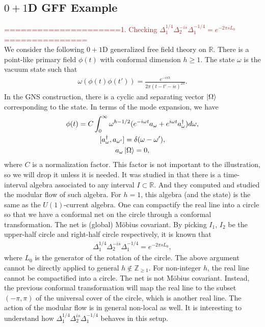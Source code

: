 \documentclass[a4paper,11pt]{article}
\theoremstyle{definition}
\newcommand{\KL}[1]{\textcolor{brown}{#1}}
\begin{document}
\subsection{$0+1$D GFF Example}
\KL{=====================1. Checking $\Delta_1^{1/4}\Delta_2^{-is}\Delta_1^{-1/4} = e^{-2\pi s L_0}$ ===============}\\
We consider the following $0+1$D generalized free field theory on $\mathbb{R}$. There is a point-like primary field $\phi(t)$ with conformal dimension $h \geq 1$. The state $\omega$ is the vacuum state such that
\begin{align}
    \omega(\phi(t)\phi(t')) = \frac{e^{-i\pi h}}{2\pi(t-t'-i\epsilon)^{2h}}.
\end{align}
In the GNS construction, there is a cyclic and separating vector $\ket{\Omega}$ corresponding to the state. In terms of the mode expansion, we have
\begin{gather}
    \phi(t) = C\int_0^\infty \omega^{h-1/2} (e^{-i\omega t}a_\omega + e^{i\omega t}a_\omega^\dagger) d\omega,\\
    [a_\omega^\dagger,a_{\omega'}] = \delta(\omega-\omega'),\\
    a_\omega\ket{\Omega} = 0,
\end{gather}
where $C$ is a normalization factor. This factor is not important to the illustration, so we will drop it unless it is needed. It was studied in \cite{} that there is a time-interval algebra associated to any interval $I \subset \mathbb{R}$. And they computed and studied the modular flow of such algebra. For $h=1$, this algebra (and the state) is the same as the $U(1)$-current algebra. One can compactify the real line into a circle so that we have a conformal net on the circle through a conformal transformation. The net is (global) M\"obius covariant. By picking $I_1$, $I_2$ be the upper-half circle and right-half circle respectively, it is known that
\begin{align}
    \Delta_1^{1/4}\Delta_2^{-is}\Delta_1^{-1/4} = e^{-2\pi s L_0},
\end{align}
where $L_0$ is the generator of the rotation of the circle. The above argument cannot be directly applied to general $h\notin\mathbb{Z}_{\geq 1}$. For non-integer $h$, the real line cannot be compactified into a circle. The net is not M\"obius covariant. Instead, the previous conformal transformation will map the real line to the subset $(-\pi,\pi)$ of the universal cover of the circle, which is another real line. The action of the modular flow is in general non-local as well. It is interesting to understand how $\Delta_1^{1/4}\Delta_2^{is}\Delta_1^{-1/4}$ behaves in this setup.
\end{document}
